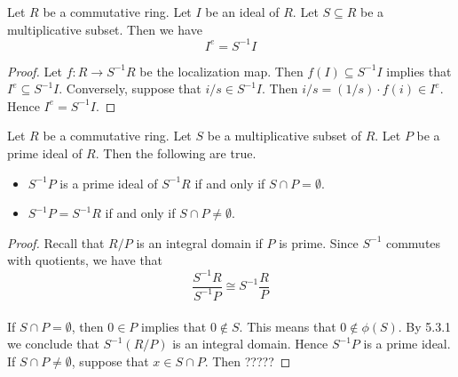 \documentclass[a4paper]{article}
\begin{document}
\begin{lmm}{}{} Let $R$ be a commutative ring. Let $I$ be an ideal of $R$. Let $S\subseteq R$ be a multiplicative subset. Then we have $$I^e=S^{-1}I$$ \tcbline
\begin{proof}
Let $f:R\to S^{-1}R$ be the localization map. Then $f(I)\subseteq S^{-1}I$ implies that $I^e\subseteq S^{-1}I$. Conversely, suppose that $i/s\in S^{-1}I$. Then $i/s=(1/s)\cdot f(i)\in I^e$. Hence $I^e=S^{-1}I$. 
\end{proof}
\end{lmm}

\begin{prp}{}{} Let $R$ be a commutative ring. Let $S$ be a multiplicative subset of $R$. Let $P$ be a prime ideal of $R$. Then the following are true. 
\begin{itemize}
\item $S^{-1}P$ is a prime ideal of $S^{-1}R$ if and only if $S\cap P=\emptyset$. 
\item $S^{-1}P=S^{-1}R$ if and only if $S\cap P\neq\emptyset$. 
\end{itemize} \tcbline
\begin{proof}
Recall that $R/P$ is an integral domain if $P$ is prime. Since $S^{-1}$ commutes with quotients, we have that $$\frac{S^{-1}R}{S^{-1}P}\cong S^{-1}\frac{R}{P}$$~\\

If $S\cap P=\emptyset$, then $0\in P$ implies that $0\notin S$. This means that $0\notin\phi(S)$. By 5.3.1 we conclude that $S^{-1}(R/P)$ is an integral domain. Hence $S^{-1}P$ is a prime ideal. If $S\cap P\neq\emptyset$, suppose that $x\in S\cap P$. Then ?????
\end{proof}
\end{prp}
\end{document}
